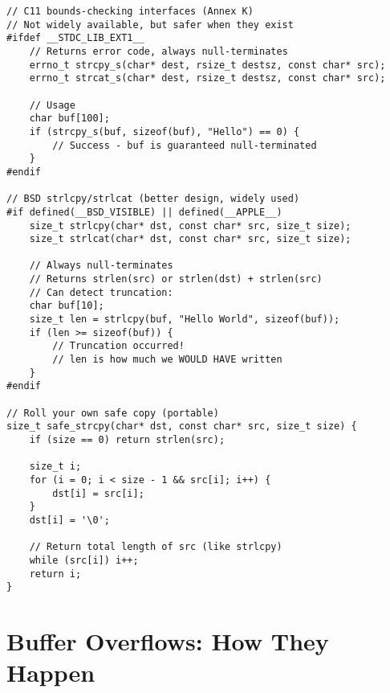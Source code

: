 \begin{lstlisting}
// C11 bounds-checking interfaces (Annex K)
// Not widely available, but safer when they exist
#ifdef __STDC_LIB_EXT1__
    // Returns error code, always null-terminates
    errno_t strcpy_s(char* dest, rsize_t destsz, const char* src);
    errno_t strcat_s(char* dest, rsize_t destsz, const char* src);

    // Usage
    char buf[100];
    if (strcpy_s(buf, sizeof(buf), "Hello") == 0) {
        // Success - buf is guaranteed null-terminated
    }
#endif

// BSD strlcpy/strlcat (better design, widely used)
#if defined(__BSD_VISIBLE) || defined(__APPLE__)
    size_t strlcpy(char* dst, const char* src, size_t size);
    size_t strlcat(char* dst, const char* src, size_t size);

    // Always null-terminates
    // Returns strlen(src) or strlen(dst) + strlen(src)
    // Can detect truncation:
    char buf[10];
    size_t len = strlcpy(buf, "Hello World", sizeof(buf));
    if (len >= sizeof(buf)) {
        // Truncation occurred!
        // len is how much we WOULD HAVE written
    }
#endif

// Roll your own safe copy (portable)
size_t safe_strcpy(char* dst, const char* src, size_t size) {
    if (size == 0) return strlen(src);

    size_t i;
    for (i = 0; i < size - 1 && src[i]; i++) {
        dst[i] = src[i];
    }
    dst[i] = '\0';

    // Return total length of src (like strlcpy)
    while (src[i]) i++;
    return i;
}
\end{lstlisting}

\section{Buffer Overflows: How They Happen}

